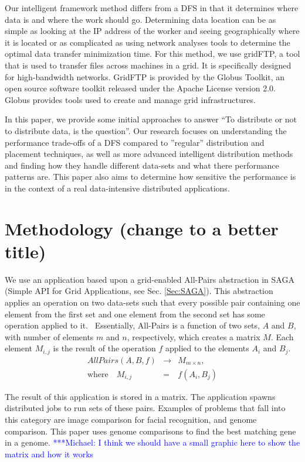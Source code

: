 \documentclass{rspublic}
\newcommand{\micnote}[1]{ {\textcolor{blue} { ***Michael: #1 }}}
\begin{document}
Our intelligent framework method differs from a DFS in that it
determines where data is and where the work should go. 
Determining data location can be as simple as
looking at the IP address of the worker and seeing geographically where
it is located or as complicated as using network analyses tools to
determine the optimal data transfer minimization time. 
For this method, we use gridFTP, a tool that is used to transfer
files across machines in a grid. It is
specifically designed for high-bandwidth networks. GridFTP is provided by
the Globus Toolkit, an open source software toolkit
released under the Apache License version 2.0. Globus provides tools used
to create and manage grid infrastructures. 

In this paper, we provide some initial approaches to answer ``To
distribute or not to distribute data, is the question''. Our research
focuses on understanding the performance trade-offs of a DFS compared to
''regular'' distribution and placement techniques, as well as more
advanced intelligent distribution methods and finding how they handle
different data-sets and what there performance patterns are. This paper
also aims to determine how sensitive the performance is in the context
of a real data-intensive distributed applications.

\section {Methodology (change to a better title)} We use an application
based upon a grid-enabled All-Pairs abstraction in SAGA (Simple API for
Grid Applications, see Sec. \ref{Sec:SAGA}). This abstraction applies an
operation on two data-sets such that every possible pair containing one
element from the first set and one element from the second set has some
operation applied to it.~\citep{Interop, AllPairs} Essentially,
All-Pairs is a function of two sets, $A$ and $B$, with number of
elements $m$ and $n$, respectively, which creates a matrix $M$. Each
element $M_{i,j}$ is the result of the operation $f$ applied to the
elements $A_i$ and $B_j$.
\begin{eqnarray}
 AllPairs(A, B, f) & \rightarrow & M_{m \times n}, \\
\mbox{where} \quad M_{i,j} & = & f(A_{i},B_{j})
 \end{eqnarray}
 
The result of this application is stored in a matrix. The application
spawns distributed jobs to run sets of these pairs. Examples of
problems that fall into this category are image comparison for facial
recognition, and genome comparison. This paper uses genome comparisons
to find the best matching gene in a genome. \micnote{I think we should
have a small graphic here to show the matrix and how it works} 
\end{document}

